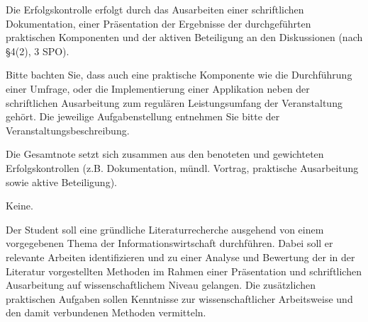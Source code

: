 \begin{course}

\setdoclanguagegerman
{}



\coursehead


\label{cour_8187.dp_997}


\begin{styleenv}
\begin{assessment}
Die Erfolgskontrolle erfolgt durch das Ausarbeiten einer schriftlichen Dokumentation, einer Präsentation der Ergebnisse der durchgeführten praktischen Komponenten und der aktiven Beteiligung an den Diskussionen (nach §4(2), 3 SPO).

 

Bitte bachten Sie, dass auch eine praktische Komponente wie die Durchführung einer Umfrage, oder die Implementierung einer Applikation neben der schriftlichen Ausarbeitung zum regulären Leistungsumfang der Veranstaltung gehört. Die jeweilige Aufgabenstellung entnehmen Sie bitte der Veranstaltungsbeschreibung.

 

Die Gesamtnote setzt sich zusammen aus den benoteten und gewichteten Erfolgskontrollen (z.B. Dokumentation, mündl. Vortrag, praktische Ausarbeitung sowie aktive Beteiligung).


\end{assessment}

\begin{conditions}Keine.\end{conditions}


\end{styleenv}

\begin{learningoutcomes}
Der Student soll eine gründliche Literaturrecherche ausgehend von einem vorgegebenen Thema der Informationswirtschaft durchführen. Dabei soll er relevante Arbeiten identifizieren und zu einer Analyse und Bewertung der in der Literatur vorgestellten Methoden im Rahmen einer Präsentation und schriftlichen Ausarbeitung auf wissenschaftlichem Niveau gelangen. Die zusätzlichen praktischen Aufgaben sollen Kenntnisse zur wissenschaftlicher Arbeitsweise und den damit verbundenen Methoden vermitteln.


\end{learningoutcomes}
\end{course}
